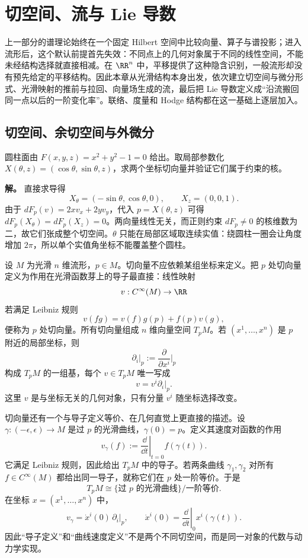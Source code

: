 \chapter{切空间、流与 Lie 导数} \label{chap:math-manifolds}

上一部分的谱理论始终在一个固定 Hilbert 空间中比较向量、算子与谱投影；进入流形后，这个默认前提首先失效：不同点上的几何对象属于不同的线性空间，不能未经结构选择就直接相减。在 $\RR^n$ 中，平移提供了这种隐含识别，一般流形却没有预先给定的平移结构。因此本章从光滑结构本身出发，依次建立切空间与微分形式、光滑映射的推前与拉回、向量场生成的流，最后把 Lie 导数定义成“沿流搬回同一点以后的一阶变化率”。联络、度量和 Hodge 结构都在这一基础上逐层加入。



\section{切空间、余切空间与外微分}

\begin{workedexample}[圆柱面的切向量]
圆柱面由 \(F(x,y,z)=x^2+y^2-1=0\) 给出。取局部参数化 \(X(\theta,z)=(\cos\theta,\sin\theta,z)\)，求两个坐标切向量并验证它们属于约束的核。

\textbf{解。} 直接求导得
\[
X_\theta=(-\sin\theta,\cos\theta,0),\qquad X_z=(0,0,1).
\]
由于 \(dF_p(v)=2xv_x+2yv_y\)，代入 \(p=X(\theta,z)\) 可得 \(dF_p(X_\theta)=dF_p(X_z)=0\)。两向量线性无关，而正则约束 \(dF_p\ne0\) 的核维数为二，故它们张成整个切空间。\(\theta\) 只能在局部区域取连续实值：绕圆柱一圈会让角度增加 \(2\pi\)，所以单个实值角坐标不能覆盖整个圆柱。
\end{workedexample}

设 $M$ 为光滑 $n$ 维流形，$p\in M$。切向量不应依赖某组坐标来定义。把 $p$ 处切向量定义为作用在光滑函数芽上的导子最直接：线性映射
\[
v:C^\infty(M)\to\RR
\]
若满足 Leibniz 规则
\[
v(fg)=v(f)g(p)+f(p)v(g),
\]
便称为 $p$ 处切向量。所有切向量组成 $n$ 维向量空间 $T_pM$。若 $(x^1,\ldots,x^n)$ 是 $p$ 附近的局部坐标，则
\[
\partial_i\big|_p:=\frac{\partial}{\partial x^i}\Big|_p
\]
构成 $T_pM$ 的一组基，每个 $v\in T_pM$ 唯一写成
\[
v=v^i\partial_i\big|_p.
\]
这里 $v$ 是与坐标无关的几何对象，只有分量 $v^i$ 随坐标选择改变。

切向量还有一个与导子定义等价、在几何直觉上更直接的描述。设 $\gamma:(-\epsilon,\epsilon)\to M$ 是过 $p$ 的光滑曲线，$\gamma(0)=p$。定义其速度对函数的作用
\[
v_\gamma(f)
:=\left.\frac{\dd}{\dd t}\right|_{t=0}f(\gamma(t)).
\]
它满足 Leibniz 规则，因此给出 $T_pM$ 中的导子。若两条曲线 $\gamma_1,\gamma_2$ 对所有 $f\in C^\infty(M)$ 都给出同一导子，就称它们在 $p$ 处一阶等价。于是
\[
T_pM
\cong
\{\text{过 }p\text{ 的光滑曲线}\}/\text{一阶等价}.
\]
在坐标 $x=(x^1,\ldots,x^n)$ 中，
\[
v_\gamma
=\dot x^i(0)\,\partial_i|_p,
\qquad
\dot x^i(0)=\left.\frac{\dd}{\dd t}\right|_0x^i(\gamma(t)).
\]
因此“导子定义”和“曲线速度定义”不是两个不同切空间，而是同一对象的代数与动力学实现。

